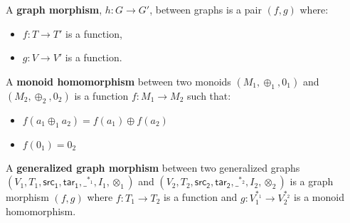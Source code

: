 %
\begin{definition}
  \label{def:Graph-Morphism}
  A \textbf{graph morphism}, $h : G \to G'$, between graphs is a pair $(f, g)$ where:
  \begin{itemize}
  \item $f: T \to T'$ is a function,
  \item $g: V \to V'$ is a function.
  \end{itemize}
\end{definition}

\begin{definition}
  \label{Monoid-Homomorphism}
  A \textbf{monoid homomorphism} between two monoids $(M_1, \oplus_1, 0_1)$ and $(M_2, \oplus_2, 0_2)$
  is a function $f: M_1 \to M_2$ such that:
  \begin{itemize}
  \item $f(a_1 \oplus_1 a_2) = f(a_1) \oplus f(a_2)$
  \item $f (0_1) = 0_2$
  \end{itemize}
\end{definition}

\begin{definition}
  \label{Petri-net-morphism}
  A \textbf{generalized graph morphism} between two generalized graphs\\
  $(V_1, T_1, \mathsf{src_1}, \mathsf{tar_1}, \_^{*_1},I_1,\otimes_1)$ and
  $(V_2, T_2, \mathsf{src_2}, \mathsf{tar_2}, \_^{*_2},I_2,\otimes_2)$ is a graph morphism
  $(f, g)$ where $f : T_1 \to T_2$ is a function and
  $g: V_1^{*_1} \to V_2^{*_2}$ is a monoid homomorphism.
\end{definition}

